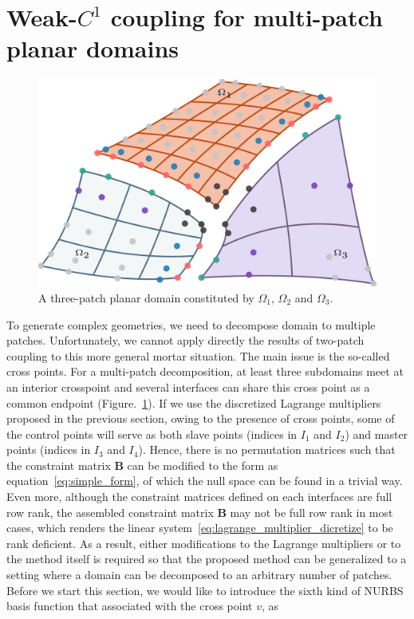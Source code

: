 \documentclass[preprint,12pt]{elsarticle}
\theoremstyle{remark}
\begin{document}
\section{Weak-$C^1$ coupling for multi-patch planar domains}
\begin{figure}
    \centering
    \includegraphics[width=\linewidth]{three_planar_patches}
    \caption{A three-patch planar domain constituted by $\Omega_1$, $\Omega_2$ and $\Omega_3$.}\label{fig:three_planar_patches}
\end{figure}
To generate complex geometries, we need to decompose domain to multiple patches. Unfortunately, we cannot apply directly the results of two-patch coupling to this more general mortar situation. The main issue is the so-called cross points. For a multi-patch decomposition, at least three subdomains meet at an interior crosspoint and several interfaces can share this cross point as a common endpoint (Figure.~\ref{fig:three_planar_patches}). If we use the discretized Lagrange multipliers proposed in the previous section, owing to the presence of cross points, some of the control points will serve as both slave points (indices in $I_1$ and $I_2$) and master points (indices in $I_3$ and $I_4$). Hence, there is no permutation matrices such that the constraint matrix $\mathbf{B}$ can be modified to the form as equation~\eqref{eq:simple_form}, of which the null space can be found in a trivial way. Even more, although the constraint matrices defined on each interfaces are full row rank, the assembled constraint matrix $\mathbf{B}$ may not be full row rank in most cases, which renders the linear system~\eqref{eq:lagrange_multiplier_dicretize} to be rank deficient. As a result, either modifications to the Lagrange multipliers or to the method itself is required so that the proposed method can be generalized to a setting where a domain can be decomposed to an arbitrary number of patches. Before we start this section, we would like to introduce the sixth kind of NURBS basis function that associated with the cross point $v$, as
\end{document}
